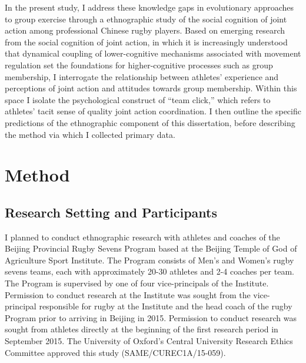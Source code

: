 In the present study, I address these knowledge gaps in evolutionary approaches to group exercise through a ethnographic study of the social cognition of joint action among professional Chinese rugby players.  Based on emerging research from the social cognition of joint action, in which it is increasingly understood that dynamical coupling of lower-cognitive mechanisms associated with movement regulation set the foundations for higher-cognitive processes such as group membership, I interrogate the relationship between athletes' experience and perceptions of joint action and attitudes towards group membership.  Within this space I isolate the psychological construct of ``team click,'' which refers to athletes' tacit sense of quality joint action coordination.   I then outline the specific predictions of the ethnographic component of this dissertation, before describing the method via which I collected primary data.


















\section{Method}




\subsection{Research Setting and Participants}

I planned to conduct ethnographic research with athletes and coaches of the Beijing Provincial Rugby Sevens Program based at the Beijing Temple of God of Agriculture Sport Institute.  The Program consists of Men's and Women's rugby sevens teams, each with approximately 20-30 athletes and 2-4 coaches per team.  The Program is supervised by one of four vice-principals of the Institute.   Permission to conduct research at the Institute was sought from the vice-principal responsible for rugby at the Institute and the head coach of the rugby Program prior to arriving in Beijing in 2015.  Permission to conduct research was sought from athletes directly at the beginning of the first research period in September 2015. The University of Oxford’s Central University Research Ethics Committee approved this study (SAME/CUREC1A/15-059).

